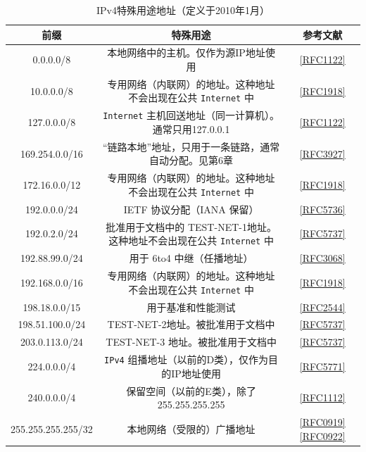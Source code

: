 \begin{table}[]
    \centering
    \caption{IPv4特殊用途地址（定义于2010年1月）}
    \begin{tabular}{c|c|c}
        \hline
        前缀	             &	特殊用途	                        &	参考文献  \\ \hline
        0.0.0.0/8	        &	本地网络中的主机。仅作为源IP地址使用	&	\href{https://www.rfc-editor.org/rfc/rfc1122}{[RFC1122]}  \\ \hline
        10.0.0.0/8	        &	专用网络（内联网）的地址。这种地址不会出现在公共 \verb|Internet| 中	&	\href{https://www.rfc-editor.org/rfc/rfc1918}{[RFC1918]}  \\ \hline
        127.0.0.0/8	        &	\verb|Internet| 主机回送地址（同一计算机）。通常只用127.0.0.1	&	\href{https://www.rfc-editor.org/rfc/rfc1122}{[RFC1122]}  \\ \hline
        169.254.0.0/16	    &	“链路本地”地址，只用于一条链路，通常自动分配。见第6章	&	\href{https://www.rfc-editor.org/rfc/rfc3927}{[RFC3927]}  \\ \hline
        172.16.0.0/12	    &	专用网络（内联网）的地址。这种地址不会出现在公共 \verb|Internet| 中	&	\href{https://www.rfc-editor.org/rfc/rfc1918}{[RFC1918]}  \\ \hline
        192.0.0.0/24	    &	IETF 协议分配（IANA 保留）	&	\href{https://www.rfc-editor.org/rfc/rfc5736}{[RFC5736]}  \\ \hline
        192.0.2.0/24	    &	批准用于文档中的 TEST-NET-1地址。这种地址不会出现在公共 \verb|Internet| 中	&	\href{https://www.rfc-editor.org/rfc/rfc5737}{[RFC5737]}  \\ \hline
        192.88.99.0/24	    &	用于 6to4 中继（任播地址）	&	\href{https://www.rfc-editor.org/rfc/rfc3068}{[RFC3068]}  \\ \hline
        192.168.0.0/16	    &	专用网络（内联网）的地址。这种地址不会出现在公共 \verb|Internet| 中	&	\href{https://www.rfc-editor.org/rfc/rfc1918}{[RFC1918]}  \\ \hline
        198.18.0.0/15	    &	用于基准和性能测试	&	\href{https://www.rfc-editor.org/rfc/rfc2544}{[RFC2544]}  \\ \hline
        198.51.100.0/24	    &	TEST-NET-2地址。被批准用于文档中	&	\href{https://www.rfc-editor.org/rfc/rfc5737}{[RFC5737]}  \\ \hline
        203.0.113.0/24	    &	TEST-NET-3 地址。被批准用于文档中	&	\href{https://www.rfc-editor.org/rfc/rfc5737}{[RFC5737]}  \\ \hline
        224.0.0.0/4	        &	\verb|IPv4| 组播地址（以前的D类），仅作为目的IP地址使用	&	\href{https://www.rfc-editor.org/rfc/rfc5771}{[RFC5771]}  \\ \hline
        240.0.0.0/4	        &	保留空间（以前的E类），除了255.255.255.255	&	\href{https://www.rfc-editor.org/rfc/rfc1112}{[RFC1112]}  \\ \hline
        255.255.255.255/32	&	本地网络（受限的）广播地址	&	\href{https://www.rfc-editor.org/rfc/rfc0919}{[RFC0919]} \href{https://www.rfc-editor.org/rfc/rfc0922}{[RFC0922]}  \\ \hline
    \end{tabular}
\end{table}

